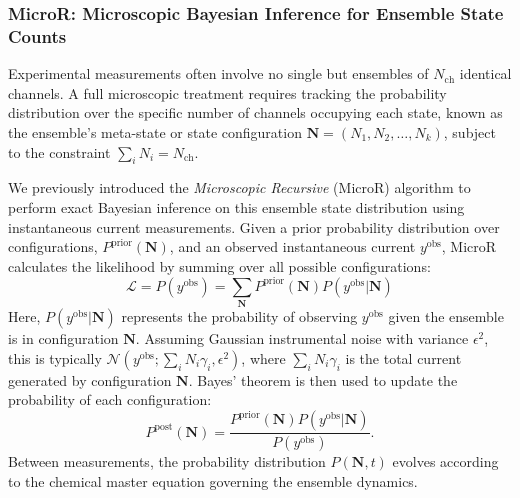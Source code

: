 \documentclass[pdflatex,sn-nature]{sn-jnl}%
\begin{document}
\subsubsection{MicroR: Microscopic Bayesian Inference for Ensemble State Counts}

Experimental measurements often involve no single but ensembles of \(N_{\text{ch}}\) identical channels. A full microscopic treatment requires tracking the probability distribution over the specific number of channels occupying each state, known as the ensemble's meta-state or state configuration \( \boldsymbol{N} = (N_1, N_2, \dots, N_k) \), subject to the constraint \( \sum_i N_i = N_{\text{ch}} \).

We previously introduced the \textit{Microscopic Recursive} (MicroR) algorithm \cite{Moffatt} to perform exact Bayesian inference on this ensemble state distribution using instantaneous current measurements. Given a prior probability distribution over configurations, \( P^{\text{prior}}(\boldsymbol{N}) \), and an observed instantaneous current \(y^{\text{obs}}\), MicroR calculates the likelihood by summing over all possible configurations:
\begin{equation}
	\mathcal{L} = P(y^{\text{obs}}) = \sum_{\boldsymbol{N}} P^{\text{prior}}(\boldsymbol{N}) P(y^{\text{obs}} | \boldsymbol{N})
	\label{eq:microR_likelihood} %
\end{equation}
Here, \( P(y^{\text{obs}} | \boldsymbol{N}) \) represents the probability of observing \(y^{\text{obs}}\) given the ensemble is in configuration \( \boldsymbol{N} \). Assuming Gaussian instrumental noise with variance \(\epsilon^2\), this is typically \( \mathcal{N}(y^{\text{obs}}; \sum_i N_i \gamma_i, \epsilon^2) \), where \( \sum_i N_i \gamma_i \) is the total current generated by configuration \( \boldsymbol{N} \). Bayes' theorem is then used to update the probability of each configuration:
\begin{equation}
	P^{\text{post}}(\boldsymbol{N}) = \frac{ P^{\text{prior}}(\boldsymbol{N}) P(y^{\text{obs}} | \boldsymbol{N})}{P(y^{\text{obs}})}.
	\label{eq:microR_posterior} %
\end{equation}
Between measurements, the probability distribution \( P(\boldsymbol{N}, t) \) evolves according to the chemical master equation governing the ensemble dynamics.
\end{document}
